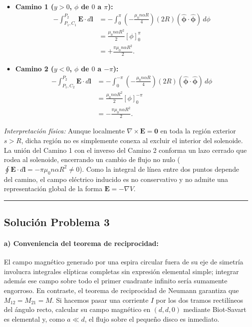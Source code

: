 \documentclass[11pt]{article}
\begin{document}
\begin{itemize}
    \item \textbf{Camino 1 ($y > 0$, $\phi$ de $0$ a $\pi$):}
    \begin{align*}
        -\int_{P_1, C_1}^{P_2}\mathbf E\cdot d\mathbf l
        &=-\int_0^{\pi}\left(-\frac{\mu_0 n\alpha R}{4}\right)
          (2R)(\hat{\boldsymbol\phi}\cdot\hat{\boldsymbol\phi})\,d\phi\\
        &=\frac{\mu_0 n\alpha R^2}{2}[\phi]_0^{\pi}\\
        &=+\frac{\pi\mu_0 n\alpha R^2}{2}.
    \end{align*}
    \item \textbf{Camino 2 ($y < 0$, $\phi$ de $0$ a $-\pi$):}
    \begin{align*}
        -\int_{P_1, C_2}^{P_2}\mathbf E\cdot d\mathbf l
        &=-\int_0^{-\pi}\left(-\frac{\mu_0 n\alpha R}{4}\right)
          (2R)(\hat{\boldsymbol\phi}\cdot\hat{\boldsymbol\phi})\,d\phi\\
        &=\frac{\mu_0 n\alpha R^2}{2}[\phi]_0^{-\pi}\\
        &=-\frac{\pi\mu_0 n\alpha R^2}{2}.
    \end{align*}
\end{itemize}
\textit{Interpretación física:} Aunque localmente $\nabla \times \mathbf{E} = \mathbf{0}$ en toda la región exterior $s > R$, dicha región no es simplemente conexa al excluir el interior del solenoide. La unión del Camino 1 con el inverso del Camino 2 conforma un lazo cerrado que rodea al solenoide, encerrando un cambio de flujo no nulo ($\oint \mathbf{E}\cdot d\mathbf{l} = -\pi \mu_0 n \alpha R^2 \neq 0$). Como la integral de línea entre dos puntos depende del camino, el campo eléctrico inducido es no conservativo y no admite una representación global de la forma $\mathbf{E} = -\nabla V$.

\vspace{0.4cm}
\hrule
\vspace{0.5cm}

\subsection*{Solución Problema 3}

\paragraph{a) Conveniencia del teorema de reciprocidad:}
El campo magnético generado por una espira circular fuera de su eje de simetría involucra integrales elípticas completas sin expresión elemental simple; integrar además ese campo sobre todo el primer cuadrante infinito sería sumamente engorroso. En contraste, el teorema de reciprocidad de Neumann garantiza que $M_{12} = M_{21} = M$. Si hacemos pasar una corriente $I$ por los dos tramos rectilíneos del ángulo recto, calcular su campo magnético en $(d, d, 0)$ mediante Biot-Savart es elemental y, como $a \ll d$, el flujo sobre el pequeño disco es inmediato.
\end{document}
